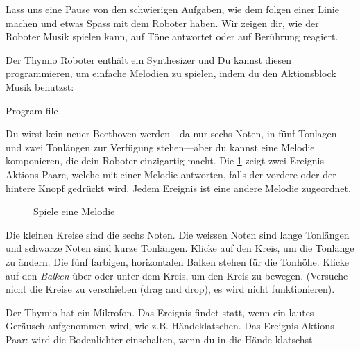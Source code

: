 \label{ch.bells}

Lass uns eine Pause von den schwierigen Aufgaben,
wie dem folgen einer Linie machen
und etwas Spass mit dem Roboter haben.
Wir zeigen dir, wie der Roboter Musik spielen kann, auf Töne antwortet oder auf Berührung reagiert.


Der Thymio Roboter enthält ein Synthesizer
und Du kannst diesen programmieren,
um einfache Melodien zu spielen,
indem du den Aktionsblock Musik benutzst: 

{\raggedleft \hfill Program file }

Du wirst kein neuer Beethoven werden---da nur sechs Noten,
in fünf Tonlagen und zwei Tonlängen
zur Verfügung stehen---aber du kannst eine Melodie komponieren,
die dein Roboter einzigartig macht. 
Die \cref{fig.music} zeigt zwei Ereignis-Aktions Paare,
welche mit einer Melodie antworten,
falls der vordere oder der hintere Knopf gedrückt wird.
Jedem Ereignis ist eine andere Melodie zugeordnet.

\begin{figure}
\begin{center}
\caption{Spiele eine Melodie}
\label{fig.music}
\end{center}
\end{figure}

Die kleinen Kreise sind die sechs Noten.
Die weissen Noten sind lange Tonlängen
und schwarze Noten sind kurze Tonlängen.
Klicke auf den Kreis, um die Tonlänge zu ändern.
Die fünf farbigen, horizontalen Balken stehen für die Tonhöhe.
Klicke auf den \emph{Balken} über oder unter dem Kreis, um den Kreis zu bewegen. 
(Versuche nicht die Kreise zu verschieben (drag and drop), es wird nicht funktionieren). 



Der Thymio hat ein Mikrofon.
Das Ereignis  findet statt,
wenn ein lautes Geräusch aufgenommen wird, wie z.B. Händeklatschen.
Das Ereignis-Aktions Paar:  
wird die Bodenlichter einschalten,
wenn du in die Hände klatschst.

